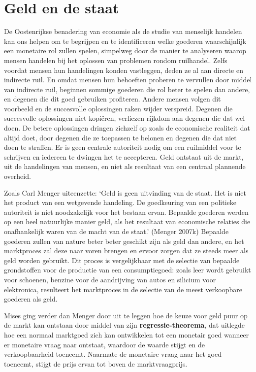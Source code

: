 \documentclass[
  a5paper,
  smalldemyvopaper,11pt,twoside,onecolumn,openright,extrafontsizes,
hidelinks]{memoir}
\begin{document}
\section{Geld en de staat}\label{geld-en-de-staat}

De Oostenrijkse benadering van economie als de studie van menselijk
handelen kan ons helpen om te begrijpen en te identificeren welke
goederen waarschijnlijk een monetaire rol zullen spelen, simpelweg door
de manier te analyseren waarop mensen handelen bij het oplossen van
problemen rondom ruilhandel. Zelfs voordat mensen hun handelingen konden
vastleggen, deden ze al aan directe en indirecte ruil. En omdat mensen
hun behoeften proberen te vervullen door middel van indirecte ruil,
beginnen sommige goederen die rol beter te spelen dan andere, en degenen
die dit goed gebruiken profiteren. Andere mensen volgen dit voorbeeld en
de succesvolle oplossingen raken wijder verspreid. Degenen die
succesvolle oplossingen niet kopiëren, verliezen rijkdom aan degenen die
dat wel doen. De betere oplossingen dringen zichzelf op zoals de
economische realiteit dat altijd doet, door degenen die ze toepassen te
belonen en degenen die dat niet doen te straffen. Er is geen centrale
autoriteit nodig om een ruilmiddel voor te schrijven en iedereen te
dwingen het te accepteren. Geld ontstaat uit de markt, uit de
handelingen van mensen, en niet als resultaat van een centraal plannende
overheid.

Zoals Carl Menger uiteenzette: `Geld is geen uitvinding van de staat.
Het is niet het product van een wetgevende handeling. De goedkeuring van
een politieke autoriteit is niet noodzakelijk voor het bestaan ervan.
Bepaalde goederen werden op een heel natuurlijke manier geld, als het
resultaat van economische relaties die onafhankelijk waren van de macht
van de staat.' (Menger 2007k) Bepaalde goederen zullen van nature beter
beter geschikt zijn als geld dan andere, en het marktproces zal deze
naar voren brengen en ervoor zorgen dat ze steeds meer als geld worden
gebruikt. Dit proces is vergelijkbaar met de selectie van bepaalde
grondstoffen voor de productie van een consumptiegoed: zoals leer wordt
gebruikt voor schoenen, benzine voor de aandrijving van autos en
silicium voor elektronica, resulteert het marktproces in de selectie van
de meest verkoopbare goederen als geld.

Mises ging verder dan Menger door uit te leggen hoe de keuze voor geld
puur op de markt kan ontstaan door middel van zijn
\textbf{regressie-theorema}, dat uitlegde hoe een normaal marktgoed zich
kan ontwikkelen tot een monetair goed wanneer er monetaire vraag naar
ontstaat, waardoor de waarde stijgt en de verkoopbaarheid toeneemt.
Naarmate de monetaire vraag naar het goed toeneemt, stijgt de prijs
ervan tot boven de marktvraagprijs.
\end{document}
